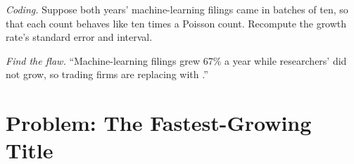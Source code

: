 \begin{exercise}[$\star\star\star$]\label{exo:in:machine-learning-and-data-engineer:7}
\emph{Coding.} Suppose both years' machine-learning filings came in batches of ten, so that each count behaves like ten
times a Poisson count. Recompute the growth rate's standard error and interval.
\end{exercise}

\begin{exercise}[$\star\star\star$]\label{exo:in:machine-learning-and-data-engineer:8}
\emph{Find the flaw.} ``Machine-learning filings grew 67\% a year while researchers' did not grow, so trading firms are
replacing  with .''
\end{exercise}

\section{Problem: The Fastest-Growing Title}

